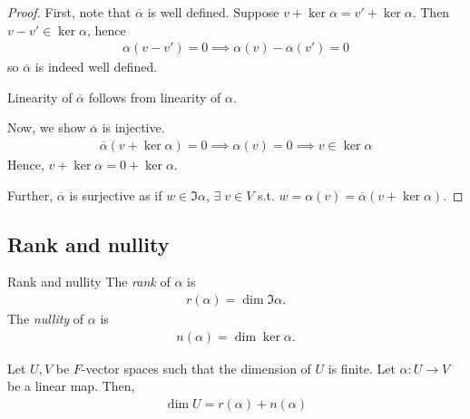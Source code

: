 \begin{proof}
    First, note that $\overline\alpha$ is well defined.
    Suppose $v + \ker \alpha = v' + \ker \alpha$.
    Then $v - v' \in \ker \alpha$, hence
    \begin{align*}
        \alpha(v - v') = 0 \implies \alpha(v) - \alpha(v') = 0
    \end{align*}
    so $\overline\alpha$ is indeed well defined.

    Linearity of $\overline \alpha$ follows from linearity of $\alpha$.

    Now, we show $\overline\alpha$ is injective.
    \begin{align*}
        \overline\alpha(v + \ker \alpha) = 0 \implies \alpha(v) = 0 \implies v \in \ker \alpha
    \end{align*}
    Hence, $v + \ker \alpha = 0 + \ker \alpha$.

    Further, $\overline\alpha$ is surjective as if $w \in \Im \alpha$, $\exists \; v \in V$ s.t. $w = \alpha(v) = \overline \alpha(v + \ker \alpha)$.
\end{proof}

\subsection{Rank and nullity}
\begin{definition}{Rank and nullity}
    The \textit{rank} of $\alpha$ is
    \begin{align*}
        r(\alpha) = \dim\Im \alpha.
    \end{align*}
    The \textit{nullity} of $\alpha$ is
    \begin{align*}
        n(\alpha) = \dim\ker \alpha.
    \end{align*}
\end{definition}

\begin{theorem}
    Let $U, V$ be $F$-vector spaces such that the dimension of $U$ is finite.
    Let $\alpha \colon U \to V$ be a linear map.
    Then,
    \begin{align*}
        \dim U = r(\alpha) + n(\alpha)
    \end{align*}
\end{theorem}


